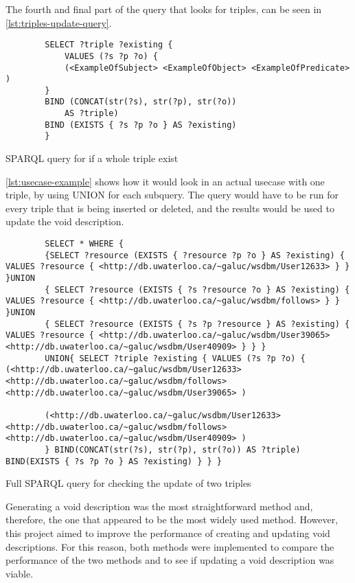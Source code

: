 The fourth and final part of the query that looks for triples, can be seen in \autoref{lst:triples-update-query}.

\begin{listing}[!ht]
    \begin{verbatim}          
        SELECT ?triple ?existing { 
            VALUES (?s ?p ?o) {  
            (<ExampleOfSubject> <ExampleOfObject> <ExampleOfPredicate> ) 
        }
        BIND (CONCAT(str(?s), str(?p), str(?o)) 
            AS ?triple)
        BIND (EXISTS { ?s ?p ?o } AS ?existing)
        }
    \end{verbatim}
    \caption{SPARQL query for if a whole triple exist}
    \label{lst:triples-update-query}
\end{listing}

\autoref{lst:usecase-example} shows how it would look in an actual usecase with one triple, by using UNION for each subquery. The query would have to be run for every triple that is being inserted or deleted, and the results would be used to update the \gls{void} description.

\begin{listing}[!ht]
    \begin{verbatim}          
        SELECT * WHERE { 
        {SELECT ?resource (EXISTS { ?resource ?p ?o } AS ?existing) { VALUES ?resource { <http://db.uwaterloo.ca/~galuc/wsdbm/User12633> } } }UNION 
        { SELECT ?resource (EXISTS { ?s ?resource ?o } AS ?existing) { VALUES ?resource { <http://db.uwaterloo.ca/~galuc/wsdbm/follows> } } }UNION 
        { SELECT ?resource (EXISTS { ?s ?p ?resource } AS ?existing) { VALUES ?resource { <http://db.uwaterloo.ca/~galuc/wsdbm/User39065> <http://db.uwaterloo.ca/~galuc/wsdbm/User40909> } } }
        UNION{ SELECT ?triple ?existing { VALUES (?s ?p ?o) {  (<http://db.uwaterloo.ca/~galuc/wsdbm/User12633>   <http://db.uwaterloo.ca/~galuc/wsdbm/follows>   <http://db.uwaterloo.ca/~galuc/wsdbm/User39065> )

        (<http://db.uwaterloo.ca/~galuc/wsdbm/User12633>       <http://db.uwaterloo.ca/~galuc/wsdbm/follows>   <http://db.uwaterloo.ca/~galuc/wsdbm/User40909> ) 
        } BIND(CONCAT(str(?s), str(?p), str(?o)) AS ?triple) BIND(EXISTS { ?s ?p ?o } AS ?existing) } } } 
    \end{verbatim}
    \caption{Full SPARQL query for checking the update of two triples}
    \label{lst:usecase-example}
\end{listing}


Generating a \gls{void} description was the most straightforward method and, therefore, the one that appeared to be the most widely used method. However, this project aimed to improve the performance of creating and updating \gls{void} descriptions. For this reason, both methods were implemented to compare the performance of the two methods and to see if updating a \gls{void} description was viable.
